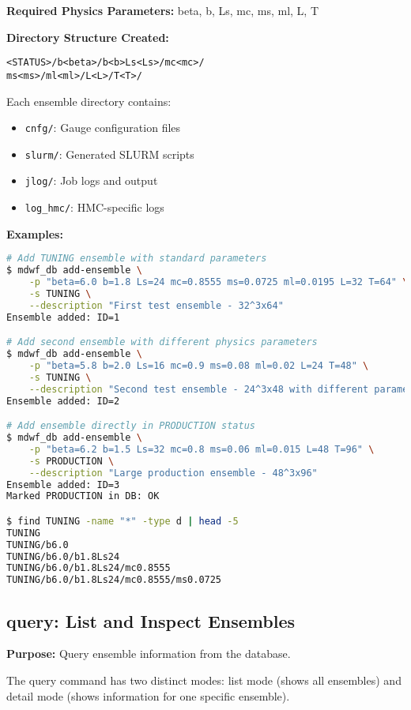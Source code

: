 \documentclass{article}
\begin{document}
\textbf{Required Physics Parameters:}
beta, b, Ls, mc, ms, ml, L, T

\textbf{Directory Structure Created:}

\texttt{<STATUS>/b<beta>/b<b>Ls<Ls>/mc<mc>/}\\
\texttt{ms<ms>/ml<ml>/L<L>/T<T>/}

Each ensemble directory contains:
\begin{itemize}
\item \texttt{cnfg/}: Gauge configuration files
\item \texttt{slurm/}: Generated SLURM scripts  
\item \texttt{jlog/}: Job logs and output
\item \texttt{log\_hmc/}: HMC-specific logs
\end{itemize}

\textbf{Examples:}
\begin{lstlisting}[language=bash]
# Add TUNING ensemble with standard parameters
$ mdwf_db add-ensemble \
    -p "beta=6.0 b=1.8 Ls=24 mc=0.8555 ms=0.0725 ml=0.0195 L=32 T=64" \
    -s TUNING \
    --description "First test ensemble - 32^3x64"
Ensemble added: ID=1

# Add second ensemble with different physics parameters
$ mdwf_db add-ensemble \
    -p "beta=5.8 b=2.0 Ls=16 mc=0.9 ms=0.08 ml=0.02 L=24 T=48" \
    -s TUNING \
    --description "Second test ensemble - 24^3x48 with different parameters"
Ensemble added: ID=2

# Add ensemble directly in PRODUCTION status
$ mdwf_db add-ensemble \
    -p "beta=6.2 b=1.5 Ls=32 mc=0.8 ms=0.06 ml=0.015 L=48 T=96" \
    -s PRODUCTION \
    --description "Large production ensemble - 48^3x96"
Ensemble added: ID=3
Marked PRODUCTION in DB: OK

$ find TUNING -name "*" -type d | head -5
TUNING
TUNING/b6.0
TUNING/b6.0/b1.8Ls24
TUNING/b6.0/b1.8Ls24/mc0.8555
TUNING/b6.0/b1.8Ls24/mc0.8555/ms0.0725
\end{lstlisting}

\subsection{query: List and Inspect Ensembles}

\textbf{Purpose:} Query ensemble information from the database.

The query command has two distinct modes: list mode (shows all ensembles) and detail mode (shows information for one specific ensemble).
\end{document}
